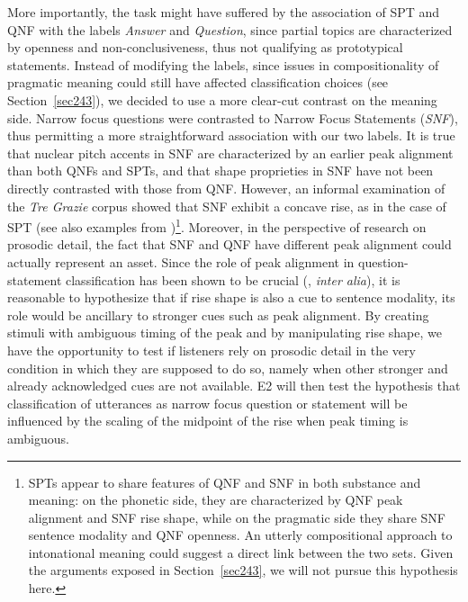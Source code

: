 More importantly, the task might have suffered by the association of SPT and QNF with the labels \textit{Answer} and \textit{Question}, since partial topics are characterized by openness and non-conclusiveness, thus not qualifying as prototypical statements. Instead of modifying the labels, since issues in compositionality of pragmatic meaning could still have affected classification choices (see Section~\ref{sec243}), we decided to use a more clear-cut contrast on the meaning side. Narrow focus questions were contrasted to Narrow Focus Statements (\textit{SNF}), thus permitting a more straightforward association with our two labels. It is true that nuclear pitch accents in SNF are characterized by an earlier peak alignment than both QNFs and SPTs, and that shape proprieties in SNF have not been directly contrasted with those from QNF. However, an informal examination of the \textit{Tre Grazie} corpus showed that SNF exhibit a concave rise, as in the case of SPT (see also examples from \citealt{dimperio2008phonetics})\footnote{SPTs appear to share features of QNF and SNF in both substance and meaning: on the phonetic side, they are characterized by QNF peak alignment and SNF rise shape, while on the pragmatic side they share SNF sentence modality and QNF openness. An utterly compositional approach to intonational meaning could suggest a direct link between the two sets. Given the arguments exposed in Section~\ref{sec243}, we will not pursue this hypothesis here.}. Moreover, in the perspective of research on prosodic detail, the fact that SNF and QNF have different peak alignment could actually represent an asset. Since the role of peak alignment in question-statement classification has been shown to be crucial (\citealt{dimperio2002italian}, \textit{inter alia}), it is reasonable to hypothesize that if rise shape is also a cue to sentence modality, its role would be ancillary to stronger cues such as peak alignment. By creating stimuli with ambiguous timing of the peak and by manipulating rise shape, we have the opportunity to test if listeners rely on prosodic detail in the very condition in which they are supposed to do so, namely when other stronger and already acknowledged cues are not available. E2 will then test the hypothesis that classification of utterances as narrow focus question or statement will be influenced by the scaling of the midpoint of the rise when peak timing is ambiguous. 

